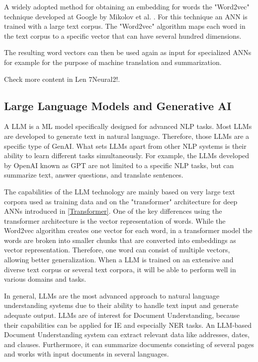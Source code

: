 A widely adopted method for obtaining an embedding for words the "Word2vec" technique developed at Google by Mikolov et al. \cite{mikolov2013}. For this technique an \ac{ANN} is trained with a large text corpus. The "Word2vec" algorithm maps each word in the text corpus to a specific vector that can have several hundred dimensions.

The resulting word vectors can then be used again as input for specialized \acp{ANN} for example for the purpose of machine translation and summarization.

Check more content in Len 7Neural2!.

\subsection{Large Language Models and Generative AI}
A \ac{LLM} is a \ac{ML} model specifically designed for advanced \ac{NLP} tasks. Most \acp{LLM} are developed to generate text in natural language. Therefore, those \acp{LLM} are a specific type of \ac{GenAI}. What sets \acp{LLM} apart from other \ac{NLP} systems is their ability to learn different tasks simultaneously. For example, the \acp{LLM} developed by OpenAI known as \ac{GPT} are not limited to a specific \ac{NLP} tasks, but can summarize text, answer questions, and translate sentences.
\cite{radford2019language}

The capabilities of the \ac{LLM} technology are mainly based on very large text corpora used as training data and on the "transformer" architecture for deep \acp{ANN} introduced in \cref{Transformer}. One of the key differences using the transformer architecture is the vector representation of words. While the Word2vec algorithm creates one vector for each word, in a transformer model the words are broken into smaller chunks that are converted into embeddings as vector representation. Therefore, one word can consist of multiple vectors, allowing better generalization.
When a \ac{LLM} is trained on an extensive and diverse text corpus or several text corpora, it will be able to perform well in various domains and tasks.
\cite{radford2019language,brown2020language}

In general, \acp{LLM} are the most advanced approach to natural language understanding systems due to their ability to handle text input and generate adequate output.
\acp{LLM} are of interest for Document Understanding, because their capabilities can be applied for \acf{IE} and especially \acf{NER} tasks. An \ac{LLM}-based Document Understanding system can extract relevant data like addresses, dates, and clauses. Furthermore, it can summarize documents consisting of several pages and works with input documents in several languages.
\cite{brown2020language,carbonell2021named}

